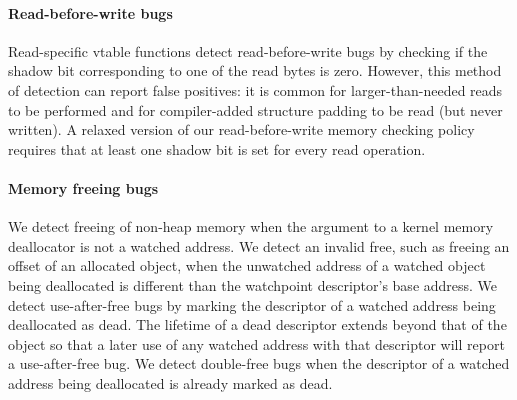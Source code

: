 \documentclass[letterpaper,twocolumn,10pt]{article}
\begin{document}
\paragraph{Read-before-write bugs}
Read-specific vtable functions detect read-before-write bugs by checking if the shadow bit corresponding to one of the read bytes is zero. However, this method of detection can report false positives: it is common for larger-than-needed reads to be performed and for compiler-added structure padding to be read (but never written). A relaxed version of our read-before-write memory checking policy requires that at least one shadow bit is set for every read operation.

\paragraph{Memory freeing bugs}
We detect freeing of non-heap memory when the argument to a kernel memory deallocator is not a watched address. We detect an invalid free, such as freeing an offset of an allocated object, when the unwatched address of a watched object being deallocated is different than the watchpoint descriptor's base address. We detect use-after-free bugs by marking the descriptor of a watched address being deallocated as dead. The lifetime of a dead descriptor extends beyond that of the object so that a later use of any watched address with that descriptor will report a use-after-free bug. We detect double-free bugs when the descriptor of a watched address being deallocated is already marked as dead.





\end{document}
